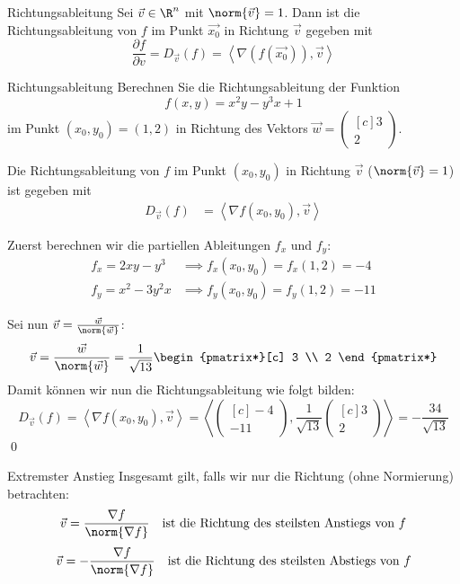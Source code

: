 \documentclass[german]{../spicker}
\newcommand{\scalarprod}[1]{\left\langle #1 \right\rangle}
\newcommand{\vektor}[1]{\begin{pmatrix*}[c] #1 \end{pmatrix*}}
\begin{document}
\begin{algo}{Richtungsableitung}
    Sei $\vec{v} \in \R^n$ mit $\norm{\vec{v}} = 1$. Dann ist die Richtungsableitung von $f$ im Punkt $\vec{x_0}$ in Richtung $\vec{v}$ gegeben mit
    $$
        \frac{\partial f}{\partial v} = D_{\vec{v}}(f) = \scalarprod{\nabla (f(\vec{x_0})) , \vec{v}}
    $$
\end{algo}

\begin{example}{Richtungsableitung}
    Berechnen Sie die Richtungsableitung der Funktion
    $$
        f(x, y) = x^2y - y^3x + 1
    $$
    im Punkt $(x_0, y_0) = (1, 2)$
    in Richtung des Vektors $\vec{w} = \vektor{3 \\ 2}$.

    \exampleseparator

    Die Richtungsableitung von $f$ im Punkt $(x_0, y_0)$ in Richtung $\vec{v}$ ($\norm{\vec{v}} = 1$) ist gegeben mit
    $$
        \begin{aligned}
            D_{\vec{v}}(f) & = \scalarprod{\nabla f(x_0, y_0), \vec{v}}
        \end{aligned}
    $$

    Zuerst berechnen wir die partiellen Ableitungen $f_x$ und $f_y$:
    $$
        \begin{aligned}
            f_x = 2xy - y^3   & \implies f_x(x_0, y_0) = f_x(1, 2) = -4  \\
            f_y = x^2 - 3y^2x & \implies f_y(x_0, y_0) = f_y(1, 2) = -11
        \end{aligned}
    $$

    Sei nun $\vec{v} = \frac{\vec{w}}{\norm{\vec{w}}}$:
    $$
        \vec{v} = \frac{\vec{w}}{\norm{\vec{w}}} = \frac{1}{\sqrt{13}} \vektor{3  \\ 2}
    $$
    Damit können wir nun die Richtungsableitung wie folgt bilden:
    $$
        D_{\vec{v}}(f) = \scalarprod{\nabla f(x_0, y_0), \vec{v}} = \scalarprod{\vektor{-4                   \\ -11},  \frac{1}{\sqrt{13}} \vektor{3  \\ 2}}=  -\frac{34}{\sqrt{13}}
    $$\qed
\end{example}

\begin{algo}{Extremster Anstieg}
    Insgesamt gilt, falls wir nur die Richtung (ohne Normierung) betrachten:
    $$
        \vec{v} = \frac{\nabla f}{\norm{ \nabla f }} \quad \text{ist die Richtung des steilsten Anstiegs von} \ f
    $$
    $$
        \vec{v} = -\frac{\nabla f}{\norm{ \nabla f }} \quad \text{ist die Richtung des steilsten Abstiegs von} \ f
    $$
\end{algo}
\end{document}
